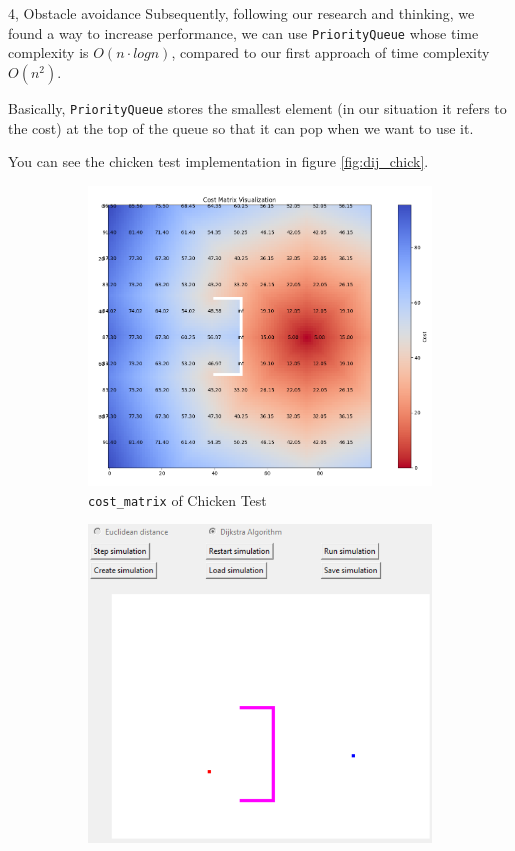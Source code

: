 \documentclass[10pt,a4paper]{article}
\begin{document}
\begin{task}{4, Obstacle avoidance}
Subsequently, following our research and thinking, we found a way to increase performance, we can use \texttt{PriorityQueue} \cite{Queue} whose time complexity is $O(n  \cdot log n)$, compared to our first approach of time complexity $O(n^2)$.

Basically, \texttt{PriorityQueue} stores the smallest element (in our situation it refers to the cost) at the top of the queue so that it can pop when we want to use it. 

You can see the chicken test implementation in figure \ref{fig:dij_chick}.






\begin{figure}[H]
    \begin{subfigure}[t]{0.5\textwidth}
        \includegraphics[width=0.9\linewidth]{images/task4_dij_chicken_cost.png}
        \caption{\texttt{cost\_matrix} of Chicken Test}
    \end{subfigure}
    \begin{subfigure}[t]{0.5\textwidth}
        \includegraphics[width=0.9\linewidth]{images/task4_dij_chicken_begin.png}

\end{subfigure}
\end{figure}
\end{task}
\end{document}
